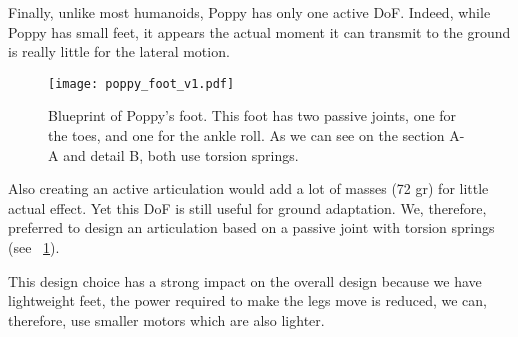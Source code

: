 

Finally, unlike most humanoids, Poppy has only one active DoF. Indeed, while Poppy has small feet, it appears the actual moment it can transmit to the ground is really little for the lateral motion.


\begin{figure}[p]
    \centering
        \texttt{[image: poppy\_foot\_v1.pdf]}
    \caption{Blueprint of Poppy's foot. This foot has two passive joints, one for the toes, and one for the ankle roll. As we can see on the section A-A and detail B, both use torsion springs.}
    \label{fig:poppy-foot-v1-design}
\end{figure}

Also creating an active articulation would add a lot of masses (72 gr) for little actual effect. Yet this DoF is still useful for ground adaptation.
We, therefore, preferred to design an articulation based on a passive joint with torsion springs (see \figurename~\ref{fig:poppy-foot-v1-design}).

This design choice has a strong impact on the overall design because we have lightweight feet, the power required to make the legs move is reduced, we can, therefore, use smaller motors which are also lighter.






